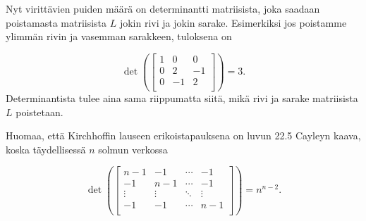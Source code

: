 Nyt virittävien puiden määrä on determinantti
matriisista, joka saadaan poistamasta matriisista $L$
jokin rivi ja jokin sarake.
Esimerkiksi jos poistamme ylimmän rivin ja
vasemman sarakkeen, tuloksena on

\[ \det(
\begin{bmatrix}
  1 & 0 & 0 \\
  0 & 2 & -1 \\
  0 & -1 & 2 \\
 \end{bmatrix}
) =3.\]
Determinantista tulee aina sama riippumatta siitä,
mikä rivi ja sarake matriisista $L$ poistetaan.

Huomaa, että Kirchhoffin lauseen erikoistapauksena on
luvun 22.5 Cayleyn kaava, koska
täydellisessä $n$ solmun verkossa

\[ \det(
\begin{bmatrix}
  n-1 & -1 & \cdots & -1 \\
  -1 & n-1 & \cdots & -1 \\
  \vdots & \vdots & \ddots & \vdots \\
  -1 & -1 & \cdots & n-1 \\
 \end{bmatrix}
) =n^{n-2}.\]



